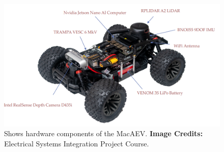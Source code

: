 \documentclass[conference]{IEEEtran}
\begin{document}


\begin{figure}
    \centering
    \includegraphics[scale=0.3]{vehicle.png}
    \caption{Shows hardware components of the MacAEV. \textbf{Image Credits:} Electrical Systems Integration Project Course.}
    \label{Figure 1}
\end{figure}


\end{document}
